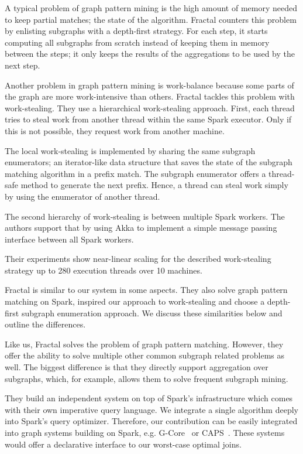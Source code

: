 A typical problem of graph pattern mining is the high amount of memory needed to keep partial matches;
the state of the algorithm.
Fractal counters this problem by enlisting subgraphs with a depth-first strategy.
For each step, it starts computing all subgraphs from scratch instead of keeping them in
memory between the steps;
it only keeps the results of the aggregations to be used by the next step.

Another problem in graph pattern mining is work-balance because some parts of the graph are
more work-intensive than others.
Fractal tackles this problem with work-stealing.
They use a hierarchical work-stealing approach.
First, each thread tries to steal work from another thread within the same Spark executor.
Only if this is not possible, they request work from another machine.

The local work-stealing is implemented by sharing the same subgraph enumerators;
an iterator-like data structure that saves the state of the subgraph matching algorithm in a prefix
match.
The subgraph enumerator offers a thread-safe method to generate the next prefix.
Hence, a thread can steal work simply by using the enumerator of another thread.

The second hierarchy of work-stealing is between multiple Spark workers.
The authors support that by using Akka to implement a simple message passing interface between
all Spark workers.

Their experiments show near-linear scaling for the described work-stealing strategy up to 280
execution threads over 10 machines.

Fractal is similar to our system in some aspects.
They also solve graph pattern matching on Spark, inspired our approach to work-stealing and
choose a depth-first subgraph enumeration approach.
We discuss these similarities below and outline the differences.

Like us, Fractal solves the problem of graph pattern matching.
However, they offer the ability to solve multiple other common subgraph related problems as well.
The biggest difference is that they directly support aggregation over subgraphs, which, for example,
allows them to solve frequent subgraph mining.

They build an independent system on top of Spark's infrastructure which comes with their own
imperative query language.
We integrate a single algorithm deeply into Spark's query optimizer.
Therefore, our contribution can be easily integrated into graph systems building on Spark, e.g.
G-Core~\cite{gcore} or CAPS~\cite{caps}.
These systems would offer a declarative interface to our worst-case optimal joins.

